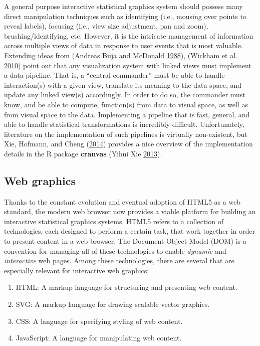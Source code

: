 \documentclass[12pt,]{isuthesis}
\providecommand{\tightlist}{%
  \setlength{\itemsep}{0pt}\setlength{\parskip}{0pt}}
\begin{document}
A general purpose interactive statistical graphics system should possess
many direct manipulation techniques such as identifying (i.e., mousing
over points to reveal labels), focusing (i.e., view size adjustment, pan
and zoom), brushing/identifying, etc. However, it is the intricate
management of information across multiple views of data in response to
user events that is most valuable. Extending ideas from (Andreas Buja
and McDonald \protect\hyperlink{ref-viewing-pipeline}{1988}), (Wickham
et al. \protect\hyperlink{ref-plumbing}{2010}) point out that any
visualization system with linked views must implement a data pipeline.
That is, a ``central commander'' must be able to handle interaction(s)
with a given view, translate its meaning to the data space, and update
any linked view(s) accordingly. In order to do so, the commander must
know, and be able to compute, function(s) from data to visual space, as
well as from visual space to the data. Implementing a pipeline that is
fast, general, and able to handle statistical transformations is
incredibly difficult. Unfortunately, literature on the implementation of
such pipelines is virtually non-existent, but Xie, Hofmann, and Cheng
(\protect\hyperlink{ref-Xie:2014co}{2014}) provides a nice overview of
the implementation details in the R package \textbf{cranvas} (Yihui Xie
\protect\hyperlink{ref-cranvas}{2013}).

\subsection{Web graphics}\label{web-graphics}

Thanks to the constant evolution and eventual adoption of HTML5 as a web
standard, the modern web browser now provides a viable platform for
building an interactive statistical graphics systems. HTML5 refers to a
collection of technologies, each designed to perform a certain task,
that work together in order to present content in a web browser. The
Document Object Model (DOM) is a convention for managing all of these
technologies to enable \emph{dynamic} and \emph{interactive} web pages.
Among these technologies, there are several that are especially relevant
for interactive web graphics:

\begin{enumerate}
\def\labelenumi{\arabic{enumi}.}
\tightlist
\item
  HTML: A markup language for structuring and presenting web content.
\item
  SVG: A markup language for drawing scalable vector graphics.
\item
  CSS: A language for specifying styling of web content.
\item
  JavaScript: A language for manipulating web content.
\end{enumerate}
\end{document}
